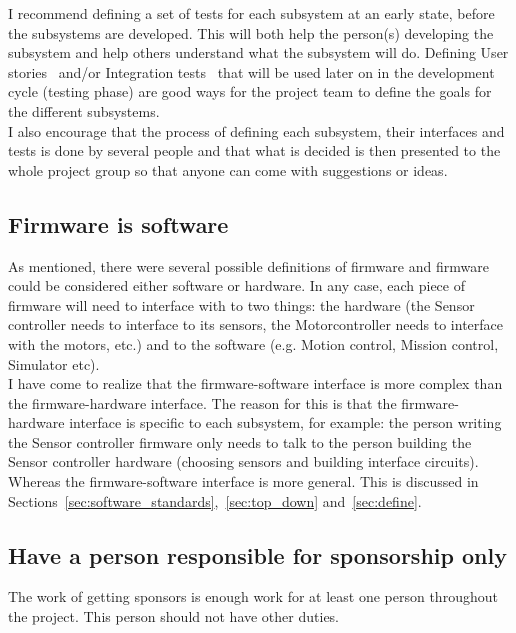 I recommend defining a set of tests for each subsystem at an early state, before the subsystems are developed.
This will both help the person(s) developing the subsystem and help others understand what the subsystem will do. 
Defining User stories~\cite{web:wiki_user_story} and/or Integration tests~\cite{web:wiki_unit_testing} that will be used later on in the development cycle (testing phase) are good ways for the project team to define the goals for the different subsystems. \\
I also encourage that the process of defining each subsystem, their interfaces and tests is done by several people and that what is decided is then presented to the whole project group so that anyone can come with suggestions or ideas.


\subsection{Firmware is software}\label{sec:firmware}
As mentioned, there were several possible definitions of firmware and firmware could be considered either software or hardware. %
In any case, each piece of firmware will need to interface with to two things: the hardware (the Sensor controller needs to interface to its sensors, the Motorcontroller needs to interface with the motors, etc.) and to the software (e.g. Motion control, Mission control, Simulator etc). \\
I have come to realize that the firmware-software interface is more complex than the firmware-hardware interface. The reason for this is that the firmware-hardware interface is specific to each subsystem, for example: the person writing the Sensor controller firmware only needs to talk to the person building the Sensor controller hardware (choosing sensors and building interface circuits). Whereas the firmware-software interface is more general. This is discussed in Sections~\ref{sec:software_standards},~\ref{sec:top_down} and~\ref{sec:define}.


\subsection{Have a person responsible for sponsorship only}
The work of getting sponsors is enough work for at least one person throughout the project. This person should not have other duties.

